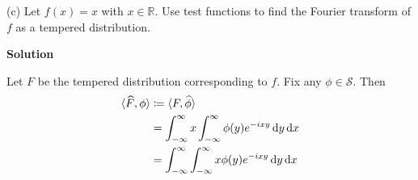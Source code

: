 \documentclass{article}
\begin{document}
\vspace{5mm}

(c) Let $f(x) = x$ with $x \in \mathbb{R}$. Use test functions to find
the Fourier transform of $f$ as a tempered distribution.

\textbf{Solution}

Let $F$ be the tempered distribution corresponding to $f$. Fix any
$\phi \in \mathcal{S}$. Then
%
\begin{align*}
    \langle \widehat{F}, \phi \rangle
        &\coloneqq \langle F, \widehat{\phi} \rangle \\
        &= \int_{-\infty}^\infty x \int_{-\infty}^\infty \phi(y) e^{-i x y} \dif y \dif x \\
        &= \int_{-\infty}^\infty \int_{-\infty}^\infty x \phi(y) e^{-i x y} \dif y \dif x
\end{align*}
\end{document}
